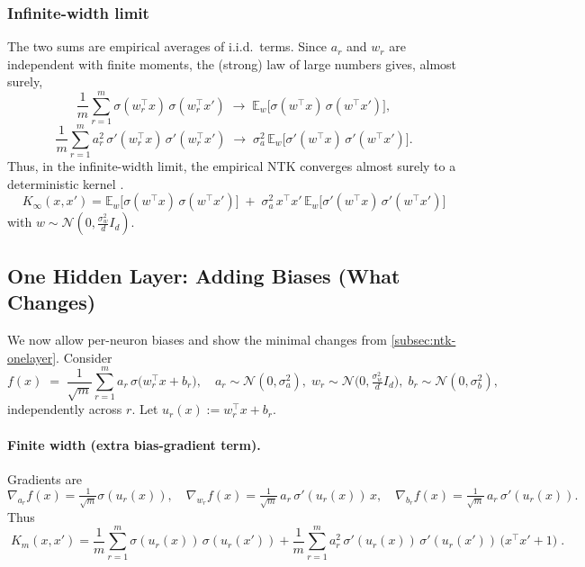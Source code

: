 \subsubsection*{Infinite-width limit}
The two sums are empirical averages of i.i.d.\ terms. Since $a_r$ and $w_r$ are independent with finite moments,
the (strong) law of large numbers gives, almost surely,
\[
	\frac{1}{m}\sum_{r=1}^m \sigma(w_r^\top x)\,\sigma(w_r^\top x')
	\;\longrightarrow\;
	\mathbb E_{w}\big[\sigma(w^\top x)\,\sigma(w^\top x')\big],
\]
\[
	\frac{1}{m}\sum_{r=1}^m a_r^2\,\sigma'(w_r^\top x)\,\sigma'(w_r^\top x')
	\;\longrightarrow\;
	\sigma_a^2\,\mathbb E_{w}\big[\sigma'(w^\top x)\,\sigma'(w^\top x')\big].
\]
Thus, in the infinite-width limit, the empirical NTK converges almost surely to a deterministic kernel
\citep{jacot2018ntk, lee2019wide}.
\[
	\boxed{\;
		K_\infty(x,x')
		=\mathbb E_{w}\!\big[\sigma(w^\top x)\,\sigma(w^\top x')\big]
		\;+\;
		\sigma_a^2\,x^\top x'\,\mathbb E_{w}\!\big[\sigma'(w^\top x)\,\sigma'(w^\top x')\big]}
	\;
\]
with $w\sim \mathcal N(0,\frac{\sigma_w^2}{d}I_d)$.


\subsection{One Hidden Layer: Adding Biases (What Changes)}\label{subsec:ntk-onelayer-bias}

We now allow per-neuron biases and show the minimal changes from \autoref{subsec:ntk-onelayer}.
Consider
\[
	f(x)\;=\;\frac{1}{\sqrt{m}}\sum_{r=1}^m a_r\,\sigma\!\big(w_r^\top x + b_r\big),
	\quad
	a_r \sim \mathcal N(0,\sigma_a^2),\;
	w_r \sim \mathcal N\!\Big(0,\tfrac{\sigma_w^2}{d}I_d\Big),\;
	b_r \sim \mathcal N(0,\sigma_b^2),
\]
independently across $r$. Let $u_r(x):=w_r^\top x + b_r$.

\paragraph{Finite width (extra bias-gradient term).}

Gradients are
\[
	\nabla_{a_r} f(x)=\tfrac{1}{\sqrt{m}}\sigma(u_r(x)),\quad
	\nabla_{w_r} f(x)=\tfrac{1}{\sqrt{m}}\,a_r\,\sigma'(u_r(x))\,x,\quad
	\nabla_{b_r} f(x)=\tfrac{1}{\sqrt{m}}\,a_r\,\sigma'(u_r(x)).
\]
Thus
\[
	\boxed{\;
		K_m(x,x')
		=\frac{1}{m}\sum_{r=1}^m \sigma(u_r(x))\,\sigma(u_r(x'))
		+\frac{1}{m}\sum_{r=1}^m a_r^2\,\sigma'(u_r(x))\,\sigma'(u_r(x'))\,\big(x^\top x' + 1\big)\; }.
\]

